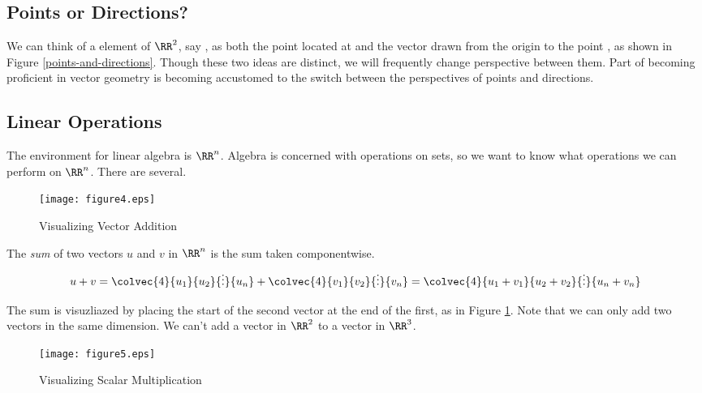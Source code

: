 \documentclass[fleqn]{report}
\begin{document}
\subsection{Points or Directions?}
\label{point-or-directions}

We can think of a element of $\RR^2$, say
, as both the point located
at  and the vector drawn
from the origin to the point
, as shown in Figure
\ref{points-and-directions}. Though these two ideas are
distinct, we will frequently change perspective between them.
Part of becoming proficient in vector geometry is becoming
accustomed to the switch between the perspectives of points
and directions.

\subsection{Linear Operations}
\label{linear-operations}

The environment for linear algebra is $\RR^n$. Algebra is
concerned with operations on sets, so we want to know what
operations we can perform on $\RR^n$. There are several.

\begin{figure}[t]
\centering
\texttt{[image: figure4.eps]}
\caption{Visualizing Vector Addition}
\label{visualizing-vector-addition}
\end{figure}

\begin{defn}
The \emph{sum} of two vectors $u$ and $v$ in $\RR^n$ is the
sum taken componentwise. 
\begin{equation*}
u + v = \colvec{4}{u_1}{u_2}{\vdots}{u_n} +
\colvec{4}{v_1}{v_2}{\vdots}{v_n} = \colvec{4}{u_1 + v_1}{u_2
+ v_2}{\vdots}{u_n + v_n}
\end{equation*}
\end{defn}

The sum is visuzliazed by placing the start of the second
vector at the end of the first, as in Figure 
\ref{visualizing-vector-addition}. Note that we can only add
two vectors in the same dimension. We can't add a vector in
$\RR^2$ to a vector in $\RR^3$.

\begin{figure}[t]
\centering
\texttt{[image: figure5.eps]}
\caption{Visualizing Scalar Multiplication}
\label{visualizing-scalar-multiplication}
\end{figure}
\end{document}
